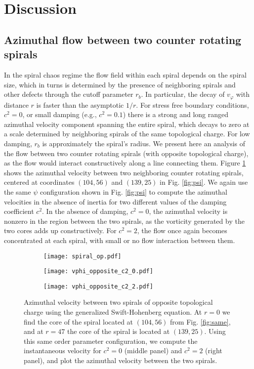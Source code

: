 \documentclass[preprint,prx,floatfix]{revtex4-1}
\begin{document}
\section{Discussion}

\subsection{Azimuthal flow between two counter rotating spirals}
\label{sec:int}

In the spiral chaos regime the flow field within each spiral depends on the spiral size, which in turns is determined by the presence of neighboring spirals and other defects through the cutoff parameter $r_b$. In particular, the decay of $v_\varphi$ with distance $r$ is faster than the asymptotic $1/r$. For stress free boundary conditions, $c^2 = 0$, or small damping (e.g., $c^2 = 0.1$) there is a strong and long ranged azimuthal velocity component spanning the entire spiral, which decays to zero at a scale determined by neighboring spirals of the same topological charge. For low damping, $r_b$ is approximately the spiral's radius. We present here an analysis of the flow between two counter rotating spirals (with opposite topological charge), as the flow would interact constructively along a line connecting them. Figure \ref{fig:opposite} shows the azimuthal velocity between two neighboring counter rotating spirals, centered at coordinates $(104,56)$ and $(139,25)$ in Fig. \ref{fig:psi}. We again use the same $\psi$ configuration shown in Fig. \ref{fig:psi} to compute the azimuthal velocities in the absence of inertia for two different values of the damping coefficient $c^{2}$. In the absence of damping, $c^{2} = 0$, the azimuthal velocity is nonzero in the region between the two spirals, as the vorticity generated by the two cores adds up constructively. For $c^2 = 2$, the flow once again becomes concentrated at each spiral, with small or no flow interaction between them.

\begin{figure}[htp]
    \begin{subfigure}{0.32\textwidth}
        \centering
        \texttt{[image: spiral\_op.pdf]}
    \end{subfigure}
    \begin{subfigure}{0.32\textwidth}
        \centering
        \texttt{[image: vphi\_opposite\_c2\_0.pdf]}
    \end{subfigure}
    \begin{subfigure}{0.32\textwidth}
        \centering
        \texttt{[image: vphi\_opposite\_c2\_2.pdf]}
    \end{subfigure}
    \caption{Azimuthal velocity between two spirals of opposite topological charge using the generalized Swift-Hohenberg equation. At $r = 0$ we find the core of the spiral located at $(104,56)$ from Fig. \ref{fig:same}, and at $r = 47$ the core of the spiral is located at $(139,25)$. Using this same order parameter configuration, we compute the instantaneous velocity for $c^2 = 0$ (middle panel) and $c^2 = 2$ (right panel), and plot the azimuthal velocity between the two spirals.}
    \label{fig:opposite}
\end{figure}
\end{document}
